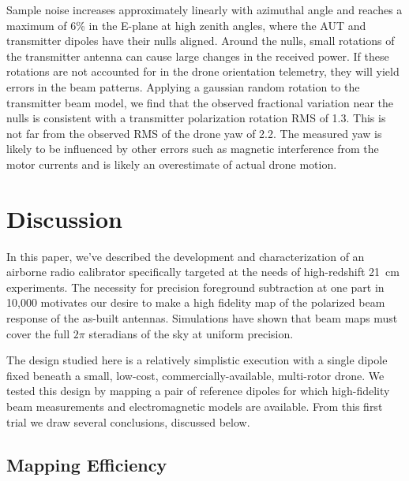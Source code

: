 \documentclass[preprint2,numberedappendix,tighten,twocolappendix]{aastex6}
\begin{document}
Sample noise increases approximately linearly with azimuthal angle and reaches a maximum of 6\% in the E-plane at high zenith angles, where the AUT and transmitter dipoles have their nulls aligned.  Around the nulls, small rotations of the transmitter antenna can cause large changes in the received power.  If these rotations are not accounted for in the drone orientation telemetry, they will yield errors in the beam patterns.  Applying a gaussian random rotation to the transmitter beam model, we find that the observed fractional variation near the nulls is consistent with a transmitter polarization  rotation RMS of 1.3\arcdeg{}.  This is not far from the observed RMS of the drone yaw of 2.2\arcdeg{}.  The measured yaw is likely to be influenced by other errors such as magnetic interference from the motor currents and is likely an overestimate of actual drone motion.



\section{Discussion}
\label{sec:conclusion}

In this paper, we've described the development and characterization of an airborne radio calibrator specifically targeted at the needs of high-redshift 21~cm experiments. The necessity for precision foreground subtraction at one part in 10,000 motivates our desire to make a high fidelity map of the polarized beam response of the as-built antennas. Simulations have shown that beam maps must cover the full $2\pi$ steradians of the sky at uniform precision. 

The design studied here is a relatively simplistic execution with a single dipole fixed beneath a small, low-cost, commercially-available, multi-rotor drone.  We tested this design by mapping a pair of reference dipoles for which high-fidelity beam measurements and electromagnetic models are available.   From this first trial we draw several conclusions, discussed below.

\subsection{Mapping Efficiency}
\end{document}
